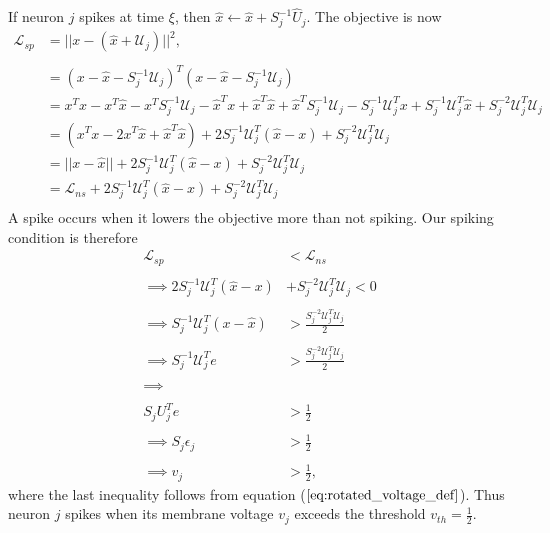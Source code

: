 \begin{enumerate}
If neuron $j$ spikes at time $\xi$, then $\hat{x} \leftarrow \hat{x} + S^{-1}_j \hat{U}_j$. The objective is now
\begin{align*}
    \mathcal{L}_{sp} &= || x - (\hat{x} + \mathcal{U}_j) ||^2,\\
    \\
    &= 
    (x-\hat{x}-S^{-1}_j \mathcal{U}_j)^T (x-\hat{x}-S^{-1}_j \mathcal{U}_j)\\
    &= 
    x^T x - x^T \hat{x} - x^T S^{-1}_j \mathcal{U}_j
    - \hat{x}^T x +\hat{x}^T\hat{x} +\hat{x}^T S^{-1}_j \mathcal{U}_j
    -
    S^{-1}_j \mathcal{U}_j^T x + S^{-1}_j \mathcal{U}_j^T \hat{x} + S^{-2}_j \mathcal{U}_j^T \mathcal{U}_j
    \\
    &=
    \left(x^T x -2 x^T \hat{x} +\hat{x}^T\hat{x}  \right) + 
    2 S^{-1}_j \mathcal{U}_j^T \left( \hat{x} - x
    \right) + S^{-2}_j \mathcal{U}_j^T \mathcal{U}_j\\
    &= 
    ||x -\hat{x}|| +  2 S^{-1}_j \mathcal{U}_j^T \left( \hat{x} - x
    \right) + S^{-2}_j \mathcal{U}_j^T \mathcal{U}_j\\
    &= 
    \mathcal{L}_{ns} + 2 S^{-1}_j \mathcal{U}_j^T \left( \hat{x} - x
    \right) + S^{-2}_j \mathcal{U}_j^T \mathcal{U}_j\\
\end{align*}
 A spike occurs when it lowers the objective more than not spiking. Our spiking condition is therefore
\begin{align*}
    \mathcal{L}_{sp} &< \mathcal{L}_{ns}\\
    \\
    \implies
     2 S^{-1}_j \mathcal{U}_j^T \left( \hat{x} - x
    \right) &+ S^{-2}_j \mathcal{U}_j^T \mathcal{U}_j < 0\\
    \\
    \implies 
    S^{-1}_j \mathcal{U}_j^T \left(x -\hat{x} \right) &> \frac{S^{-2}_j \mathcal{U}_j ^T \mathcal{U}_j}{2}\\
    \\
    \implies
    S^{-1}_j \mathcal{U}_j^T e &> \frac{S^{-2}_j \mathcal{U}_j^T \mathcal{U}_j}{2}
    \\
    \\
    \implies
    \\
    \\
    S_j U_j^T e &> \frac{1}{2}
    \\
    \\
    \implies S_j \epsilon_j &> \frac{1}{2}
    \\
    \\
    \implies
    v_j &> \frac{1}{2},
\end{align*}
where the last inequality follows from equation ($\ref{eq:rotated_voltage_def}$). Thus neuron $j$ spikes when its membrane voltage $v_j$ exceeds the threshold $v_{th} = \frac{1}{2}$. 


\end{enumerate}
